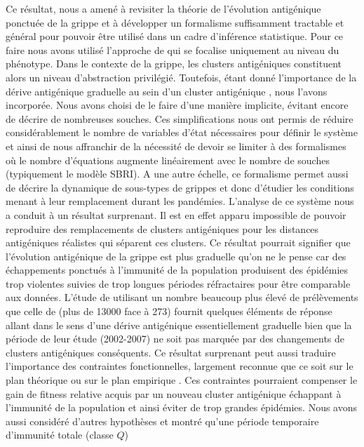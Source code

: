 Ce résultat, nous a amené à revisiter la théorie de l'évolution
antigénique ponctuée de la grippe et à développer un formalisme
suffisamment tractable et général pour pouvoir être utilisé dans un
cadre d'inférence statistique. Pour ce faire nous avons utilisé
l'approche de \cite{Koelle2009} qui se focalise uniquement au niveau
du phénotype. Dans le contexte de la grippe, les clusters antigéniques
constituent alors un niveau d'abstraction privilégié. Toutefois, étant
donné l'importance de la dérive antigénique graduelle au sein d'un
cluster antigénique \citep{Shih2007, Russell2008}, nous l'avons
incorporée. Nous avons choisi de le faire d'une manière implicite,
évitant encore de décrire de nombreuses souches. Ces simplifications
nous ont permis de réduire considérablement le nombre de variables
d'état nécessaires pour définir le système et ainsi de nous affranchir
de la nécessité de devoir se limiter à des formalismes où le nombre
d'équations augmente linéairement avec le nombre de souches
(typiquement le modèle SBRI). A une autre échelle, ce formalisme
permet aussi de décrire la dynamique de sous-types de grippes et donc
d'étudier les conditions menant à leur remplacement durant les
pandémies. L'analyse de ce système nous a conduit à un résultat
surprenant. Il est en effet apparu impossible de pouvoir reproduire
des remplacements de clusters antigéniques pour les distances
antigéniques réalistes qui séparent ces clusters. Ce résultat pourrait
signifier que l'évolution antigénique de la grippe est plus graduelle
qu'on ne le pense car des échappements ponctués à l'immunité de la
population produisent des épidémies trop violentes suivies de trop
longues périodes réfractaires pour être comparable aux données.
L'étude de \citet{Russell2008} utilisant un nombre beaucoup plus élevé
de prélèvements que celle de \citet{Smith2004} (plus de 13000 face à
273) fournit quelques éléments de réponse allant dans le sens d'une
dérive antigénique essentiellement graduelle bien que la période de
leur étude (2002-2007) ne soit pas marquée par des changements de
clusters antigéniques conséquents. Ce résultat surprenant peut aussi
traduire l'importance des contraintes fonctionnelles, largement
reconnue que ce soit sur le plan théorique \citep{Belshaw2008} ou sur
le plan empirique \citep{Rambaut2008}. Ces contraintes pourraient
compenser le gain de fitness relative acquis par un nouveau cluster
antigénique échappant à l'immunité de la population et ainsi éviter de
trop grandes épidémies. Nous avons aussi considéré d'autres hypothèses
et montré qu'une période temporaire d'immunité totale (classe $Q$)
